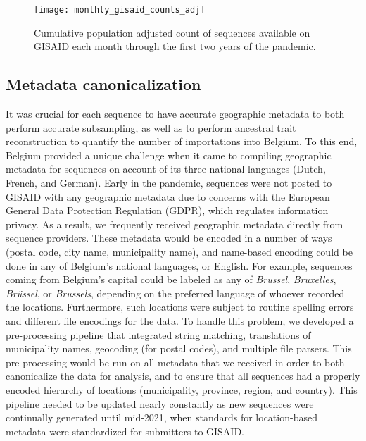 \begin{figure}[ht]
  \centering
  \texttt{[image: monthly\_gisaid\_counts\_adj]}
  \caption[Population-adjusted GISAID sequences]{Cumulative population adjusted count of sequences available on GISAID each month through the first two years of the pandemic.}
  \label{fig:gisaidSeq}
\end{figure}

\subsection{Metadata canonicalization}
It was crucial for each sequence to have accurate geographic metadata to both perform accurate subsampling, as well as to perform ancestral trait reconstruction to quantify the number of importations into Belgium.
To this end, Belgium provided a unique challenge when it came to compiling geographic metadata for sequences on account of its three national languages (Dutch, French, and German).
Early in the pandemic, sequences were not posted to GISAID with any geographic metadata due to concerns with the European General Data Protection Regulation (GDPR), which regulates information privacy.
As a result, we frequently received geographic metadata directly from sequence providers.
These metadata would be encoded in a number of ways (postal code, city name, municipality name), and name-based encoding could be done in any of Belgium's national languages, or English.
For example, sequences coming from Belgium's capital could be labeled as any of \textit{Brussel}, \textit{Bruxelles}, \textit{Br\"{u}ssel}, or \textit{Brussels}, depending on the preferred language of whoever recorded the locations.
Furthermore, such locations were subject to routine spelling errors and different file encodings for the data.
To handle this problem, we developed a pre-processing pipeline that integrated string matching, translations of municipality names, geocoding (for postal codes), and multiple file parsers.
This pre-processing would be run on all metadata that we received in order to both canonicalize the data for analysis, and to ensure that all sequences had a properly encoded hierarchy of locations (municipality, province, region, and country).
This pipeline needed to be updated nearly constantly as new sequences were continually generated until mid-2021, when standards for location-based metadata were standardized for submitters to GISAID.

